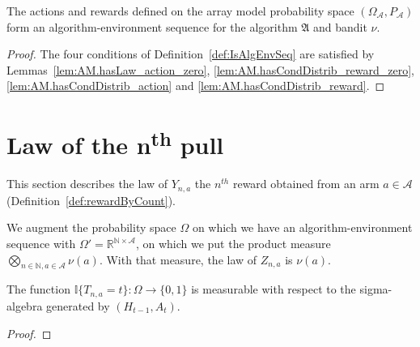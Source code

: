 \begin{theorem}\label{thm:isAlgEnvSeq_arrayMeasure}
  \leanok
The actions and rewards defined on the array model probability space $(\Omega_{\mathcal{A}}, P_{\mathcal{A}})$ form an algorithm-environment sequence for the algorithm $\mathfrak{A}$ and bandit $\nu$.
\end{theorem}

\begin{proof}\leanok
The four conditions of Definition~\ref{def:IsAlgEnvSeq} are satisfied by Lemmas~\ref{lem:AM.hasLaw_action_zero}, \ref{lem:AM.hasCondDistrib_reward_zero}, \ref{lem:AM.hasCondDistrib_action} and \ref{lem:AM.hasCondDistrib_reward}.
\end{proof}




\section{Law of the n\textsuperscript{th} pull}\label{sec:alt_model}

This section describes the law of $Y_{n, a}$ the $n^{th}$ reward obtained from an arm $a \in \mathcal{A}$ (Definition~\ref{def:rewardByCount}).

We augment the probability space $\Omega$ on which we have an algorithm-environment sequence with $\Omega' = \mathbb{R}^{\mathbb{N} \times \mathcal{A}}$, on which we put the product measure $\bigotimes_{n \in \mathbb{N}, a \in \mathcal{A}} \nu(a)$.
With that measure, the law of $Z_{n,a}$ is $\nu(a)$.


\begin{lemma}\label{lem:measurable_comap_indicator_stepsUntil_eq}
  \leanok
The function $\mathbb{I}\{T_{n,a} = t\} : \Omega \to \{0, 1\}$ is measurable with respect to the sigma-algebra generated by $(H_{t-1}, A_t)$.
\end{lemma}

\begin{proof}\leanok

\end{proof}


